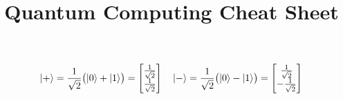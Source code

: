 \documentclass[12pt]{article}
\title{\vspace{-1.2cm}Quantum Computing Cheat Sheet}
\date{}
\begin{document}
\begin{equation*}
	{\left\vert{+}\right\rangle} = \frac{1}{\sqrt{2}} \big( {\left\vert{0}\right\rangle} + {\left\vert{1}\right\rangle} \big) 
	= \begin{bmatrix} \frac{1}{\sqrt{2}} \\ \frac{1}{\sqrt{2}} \end{bmatrix}
	\quad
	{\left\vert{-}\right\rangle} = \frac{1}{\sqrt{2}} \big( {\left\vert{0}\right\rangle} - {\left\vert{1}\right\rangle} \big) 
	= \begin{bmatrix} \frac{1}{\sqrt{2}} \\ -\frac{1}{\sqrt{2}} \end{bmatrix}
\end{equation*}
\end{document}
